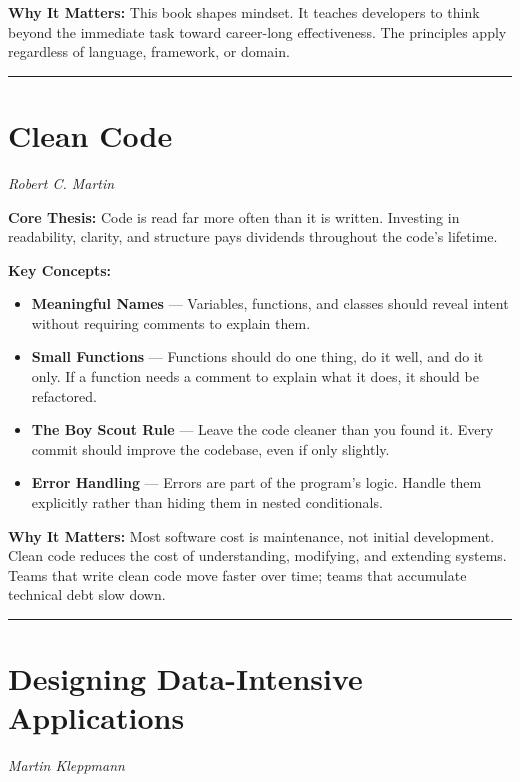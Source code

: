 \documentclass[11pt, letterpaper]{article}
\begin{document}
\textbf{Why It Matters:} This book shapes mindset. It teaches developers to think beyond the immediate task toward career-long effectiveness. The principles apply regardless of language, framework, or domain.

\vspace{1em}

\hrule

\vspace{1em}

\section*{Clean Code}
\textit{Robert C. Martin}

\textbf{Core Thesis:} Code is read far more often than it is written. Investing in readability, clarity, and structure pays dividends throughout the code's lifetime.

\textbf{Key Concepts:}
\begin{itemize}
    \item \textbf{Meaningful Names} --- Variables, functions, and classes should reveal intent without requiring comments to explain them.
    \item \textbf{Small Functions} --- Functions should do one thing, do it well, and do it only. If a function needs a comment to explain what it does, it should be refactored.
    \item \textbf{The Boy Scout Rule} --- Leave the code cleaner than you found it. Every commit should improve the codebase, even if only slightly.
    \item \textbf{Error Handling} --- Errors are part of the program's logic. Handle them explicitly rather than hiding them in nested conditionals.
\end{itemize}

\textbf{Why It Matters:} Most software cost is maintenance, not initial development. Clean code reduces the cost of understanding, modifying, and extending systems. Teams that write clean code move faster over time; teams that accumulate technical debt slow down.

\vspace{1em}

\hrule

\vspace{1em}

\section*{Designing Data-Intensive Applications}
\textit{Martin Kleppmann}
\end{document}
